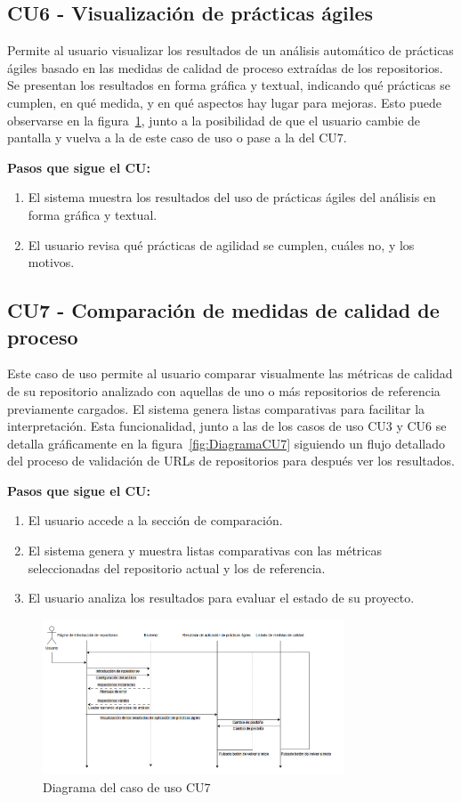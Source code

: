 \subsection*{CU6 - Visualización de prácticas ágiles}

Permite al usuario visualizar los resultados de un análisis automático de prácticas ágiles basado en las medidas de calidad de proceso extraídas de los repositorios. Se presentan los resultados en forma gráfica y textual, indicando qué prácticas se cumplen, en qué medida, y en qué aspectos hay lugar para mejoras. Esto puede observarse en la figura~\ref{fig:DiagramaCU3-CU6-CU7}, junto a la posibilidad de que el usuario cambie de pantalla y vuelva a la de este caso de uso o pase a la del CU7.

\textbf{Pasos que sigue el CU:}
\begin{enumerate}
  \item El sistema muestra los resultados del uso de prácticas ágiles del análisis en forma gráfica y textual.
  \item El usuario revisa qué prácticas de agilidad se cumplen, cuáles no, y los motivos.
\end{enumerate}

\subsection*{CU7 - Comparación de medidas de calidad de proceso}

Este caso de uso permite al usuario comparar visualmente las métricas de calidad de su repositorio analizado con aquellas de uno o más repositorios de referencia previamente cargados. El sistema genera listas comparativas para facilitar la interpretación. Esta funcionalidad, junto a las de los casos de uso CU3 y CU6 se detalla gráficamente en la figura~\ref{fig:DiagramaCU7} siguiendo un flujo detallado del proceso de validación de URLs de repositorios para después ver los resultados.

\textbf{Pasos que sigue el CU:}
\begin{enumerate}
  \item El usuario accede a la sección de comparación.
  \item El sistema genera y muestra listas comparativas con las métricas seleccionadas del repositorio actual y los de referencia.
  \item El usuario analiza los resultados para evaluar el estado de su proyecto.
\end{enumerate}

\begin{figure}[H]
\centering
\includegraphics[width=0.8\textwidth]{img/DiagramaCU3-CU6-CU7.png}
\caption{Diagrama del caso de uso CU7}
\label{fig:DiagramaCU3-CU6-CU7}
\end{figure}
